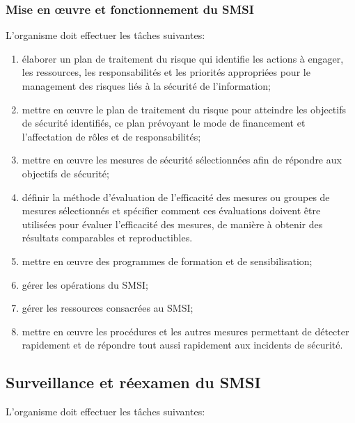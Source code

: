 \subsubsection{Mise en \oe{}uvre et fonctionnement du SMSI}

L'organisme doit effectuer les tâches suivantes:

\begin{enumerate}
	\item élaborer un plan de traitement du risque qui identifie les actions à engager, les ressources, les responsabilités et les priorités appropriées pour le management des risques liés à la sécurité de l'information;

	\item mettre en œuvre le plan de traitement du risque pour atteindre les objectifs de sécurité identifiés, ce plan prévoyant le mode de financement et l'affectation de rôles et de responsabilités;

	\item mettre en œuvre les mesures de sécurité sélectionnées afin de répondre aux objectifs de sécurité;

	\item définir la méthode d'évaluation de l'efficacité des mesures ou groupes de mesures sélectionnés et spécifier comment ces évaluations doivent être utilisées pour évaluer l'efficacité des mesures, de manière à obtenir des résultats comparables et reproductibles.

	\item mettre en œuvre des programmes de formation et de sensibilisation;

	\item gérer les opérations du SMSI;

	\item gérer les ressources consacrées au SMSI;

	\item mettre en œuvre les procédures et les autres mesures permettant de détecter rapidement et de répondre tout aussi rapidement aux incidents de sécurité.
\end{enumerate}

\subsection{Surveillance et réexamen du SMSI}

L'organisme doit effectuer les tâches suivantes:

